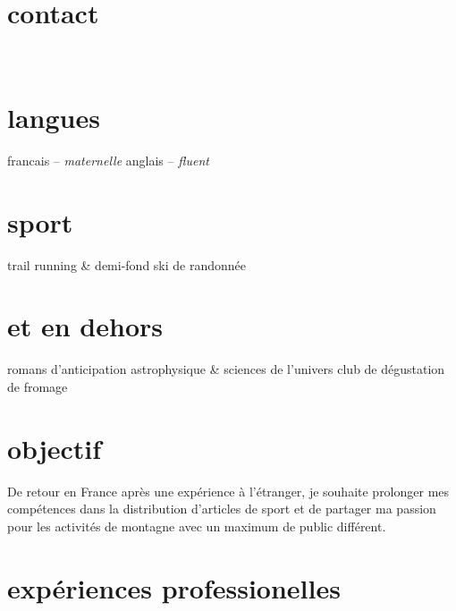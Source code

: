 \documentclass[]{farangoth-cv}
\begin{document}
\makeheader{}

\begin{aside}
  \section{contact}\label{sec:about}
  \myPhoneNumber{}
  ~
  \href{mailto:\myMail}{\myMail}
  \href{\myLinkedin}{}
  ~
  \myAddress{}

  \section{langues}
  francais \--- \emph{maternelle}
  anglais \--- \emph{fluent}
  
  \section{sport}
  trail running \& demi-fond
  ski de randonnée

  \section{et en dehors}
  romans d'anticipation
  astrophysique \& sciences de l'univers
  club de dégustation de fromage  
\end{aside}

\section{objectif}
De retour en France après une expérience à l'étranger, je souhaite prolonger mes compétences dans la distribution d'articles de sport et de partager ma passion pour les activités de montagne avec un maximum de public différent.

\section{expériences professionelles}
\end{document}
